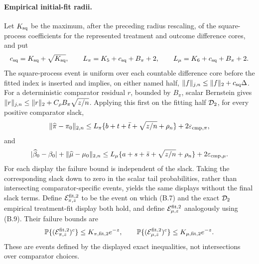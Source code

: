 \paragraph{Empirical initial-fit radii.}
Let \(K_{\rm sq}\) be the maximum, after the preceding radius rescaling, of
the square-process coefficients for the represented treatment and outcome
difference cores, and put
\[
 c_{\rm sq}=K_{\rm sq}+\sqrt{K_{\rm sq}},\qquad
 L_\pi=K_5+c_{\rm sq}+B_\pi+2,\qquad
 L_\mu=K_6+c_{\rm sq}+B_\pi+2.
\]
The square-process event is uniform over each countable difference core before
the fitted index is inserted and implies, on either named half,
\(\lVert f\rVert_{j,n}\le\lVert f\rVert_2+c_{\rm sq}\Delta\).  For a deterministic
comparator residual \(r\), bounded by \(B_\pi\), scalar Bernstein gives
\(\lVert r\rVert_{j,n}\le\lVert r\rVert_2+C_\rho B_\pi\sqrt{z/n}\).
Applying this first on the fitting half \(\mathcal D_2\), for every positive
comparator slack,
\[
 \|\widehat\pi-\pi_0\|_{2,n}
 \le L_\pi\{b+t+\bar t+\sqrt{z/n}+\rho_n\}
       +2\varepsilon_{\rm cmp,\pi},
\]
and
\[
 |\widehat\beta_0-\beta_0|+\|\widehat\mu-\mu_0\|_{2,n}
 \le L_\mu\{a+s+\bar s+\sqrt{z/n}+\rho_n\}
       +2\varepsilon_{\rm cmp,\mu}.
\]
For each display the failure bound is independent of the slack.  Taking the
corresponding slack down to zero in the scalar tail probabilities, rather than intersecting comparator-specific events, yields the same displays without the
final slack terms.  Define \(\mathcal E_{\pi,z}^{\rm fit,2}\) to be the event
on which (B.7) and the exact \(\mathcal D_2\) empirical treatment-fit display both
hold, and define \(\mathcal E_{\mu,z}^{\rm fit,2}\) analogously using (B.9).
Their failure bounds are
\[
 \mathbb P\{(\mathcal E_{\pi,z}^{\rm fit,2})^c\}
 \le K_{\pi,\rm fit,2}e^{-z},\qquad
 \mathbb P\{(\mathcal E_{\mu,z}^{\rm fit,2})^c\}
 \le K_{\mu,\rm fit,2}e^{-z}.
\]
These are events defined by the displayed exact inequalities, not
intersections over comparator choices.

